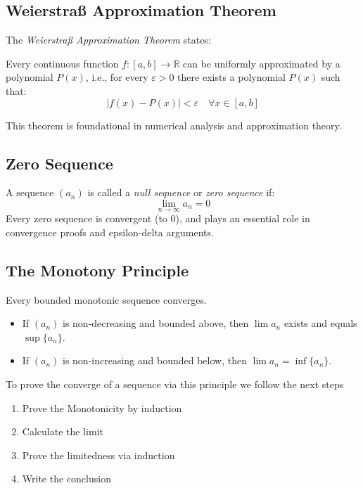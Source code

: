 \subsection{Weierstraß Approximation Theorem}

The \emph{Weierstraß Approximation Theorem} states:

Every continuous function \(f: [a, b] \rightarrow \mathbb{R}\) can be uniformly approximated by a polynomial \(P(x)\), i.e., for every \(\varepsilon > 0\) there exists a polynomial \(P(x)\) such that:
\[
|f(x) - P(x)| < \varepsilon \quad \forall x \in [a, b]
\]

This theorem is foundational in numerical analysis and approximation theory.

\subsection{Zero Sequence}

A sequence \((a_n)\) is called a \emph{null sequence} or \emph{zero sequence} if:
\[
\lim_{n \to \infty} a_n = 0
\]
Every zero sequence is convergent (to 0), and plays an essential role in convergence proofs and epsilon-delta arguments.

\subsection{The Monotony Principle}

Every bounded monotonic sequence converges.

\begin{itemize}[label=\(-\)]
\item If \((a_n)\) is non-decreasing and bounded above, then \(\lim a_n\) exists and equals \(\sup \{a_n\}\).
\item If \((a_n)\) is non-increasing and bounded below, then \(\lim a_n = \inf \{a_n\}\).
\end{itemize}

To prove the converge of a sequence via this principle we follow the next steps

\begin{enumerate}
    \item Prove the Monotonicity by induction
    \item Calculate the limit
    \item Prove the limitedness via induction
    \item Write the conclusion
\end{enumerate}

